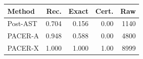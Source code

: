 \begin{tabular}{lrrrr}
\toprule
Method & Rec. & Exact & Cert. & Raw\\
\midrule
Post-AST & 0.704 & 0.156 & 0.00 & 1140\\
PACER-A & 0.948 & 0.588 & 0.00 & 4800\\
PACER-X & 1.000 & 1.000 & 1.00 & 8999\\
\bottomrule
\end{tabular}